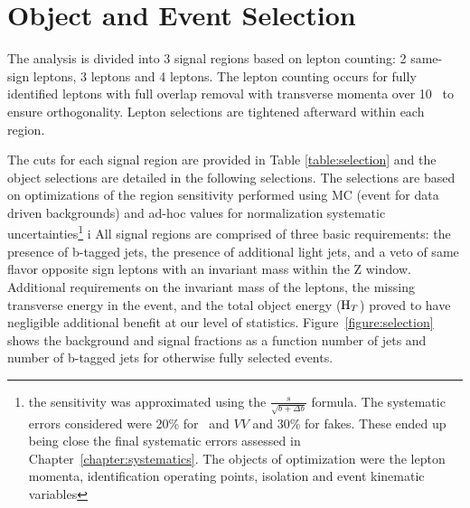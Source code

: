 \chapter[Object and Event Selection][Object and Event Selection]{Object and Event Selection}
\label{chapter:selection}

The analysis is divided into 3 signal regions based
on lepton counting: 2 same-sign leptons, 3 leptons and 4 leptons. The lepton
counting occurs for fully identified leptons with full overlap removal with
transverse momenta over 10 \gev\ to ensure orthogonality. Lepton selections are tightened
afterward within each region.

The cuts for each signal region are provided in Table \ref{table:selection} and the object selections are detailed in the
following selections. The selections are based on optimizations of the region sensitivity
performed using MC (event for data driven backgrounds) and ad-hoc values for normalization systematic uncertainties\footnote{the sensitivity was approximated using the $\frac{s}{\sqrt{b + \Delta b}}$ formula. The systematic errors considered were 20\% for \ttV\ and $VV$ and 30\% for fakes. These ended up being close the final systematic errors assessed in Chapter~\ref{chapter:systematics}. The objects of optimization were the lepton momenta, identification operating points, isolation and event kinematic variables} 
i
All signal regions are comprised of three basic requirements: the presence of b-tagged
jets, the presence of additional light jets, and a veto of same flavor opposite sign leptons with an
invariant mass within the Z window. Additional requirements on the invariant mass of the leptons, the missing transverse energy
in the event, and the total object energy ($\rm H_{T}$) proved to have negligible additional benefit at our level of 
statistics. Figure~\ref{figure:selection} shows the background and signal fractions as a function number of jets and 
number of b-tagged jets for otherwise fully selected events. 


